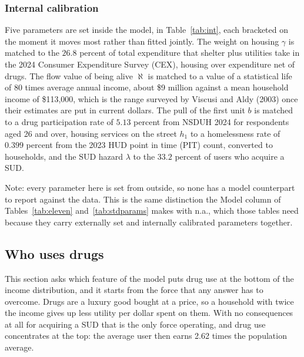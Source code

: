 \documentclass[10pt]{article}
\newcommand{\notes}[2]{\par\vspace{0.4em}%
  \begin{minipage}{#1}\footnotesize #2\end{minipage}}
\newcommand{\tabnote}[1]{\notes{\wd\ntbox}{#1}}
\begin{document}
\subsubsection{Internal calibration}

Five parameters are set inside the model, in Table~\ref{tab:int}, each bracketed
on the moment it moves most rather than fitted jointly. The weight on
housing $\gamma$ is matched to the $26.8$ percent of total expenditure that
shelter plus utilities take in the 2024 Consumer Expenditure Survey (CEX),
housing over expenditure net of drugs. The flow value
of being alive $\aleph$ is matched to a value of a statistical life of 80
times average annual income, about \$9 million against a mean household income of
\$113,000, which is the range surveyed by Viscusi and Aldy (2003) once their
estimates are put in current dollars. The pull of the first unit $b$ is matched
to a drug participation rate of $5.13$ percent from NSDUH 2024 for
respondents aged 26 and over, housing services on the street
$h_1$ to a homelessness rate of $0.399$ percent from the 2023 HUD point in
time (PIT) count, converted to households, and the SUD hazard $\lambda$ to the $33.2$ percent of users who
acquire a SUD.

\begin{table}[!tb]
\centering
\caption{Externally set parameters}\label{tab:ext}
\sbox{\ntbox}{}\usebox{\ntbox}
\tabnote{Note: every parameter here is set from outside, so none has a model counterpart to report against the data. This is the same distinction the Model column of Tables~\ref{tab:eleven} and~\ref{tab:stdparams} makes with n.a., which those tables need because they carry externally set and internally calibrated parameters together.}
\end{table}

\begin{table}[!tb]
\centering
\caption{Internally calibrated parameters}\label{tab:int}

\end{table}

\subsection{Who uses drugs}\label{sec:who}

This section asks which feature of the model puts drug use at the bottom of the
income distribution, and it starts from the force that any answer has to
overcome. Drugs are a luxury good bought at a price, so a household with
twice the income gives up less utility per dollar spent on them. With no consequences
at all for acquiring a SUD that is the only force operating, and drug use
concentrates at the top: the average user then earns 2.62 times the
population average.
\end{document}
